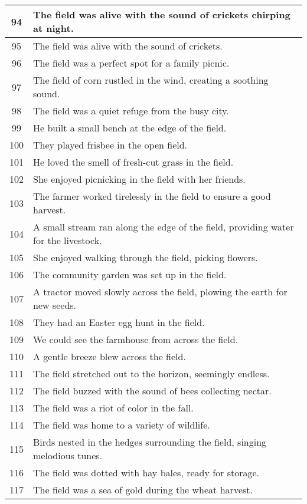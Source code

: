 \begin{longtable}{|c|p{12cm}|}
94 & The field was alive with the sound of crickets chirping at night. \\ \hline
95 & The field was alive with the sound of crickets. \\ \hline
96 & The field was a perfect spot for a family picnic. \\ \hline
97 & The field of corn rustled in the wind, creating a soothing sound. \\ \hline
98 & The field was a quiet refuge from the busy city. \\ \hline
99 & He built a small bench at the edge of the field. \\ \hline
100 & They played frisbee in the open field. \\ \hline
101 & He loved the smell of fresh-cut grass in the field. \\ \hline
102 & She enjoyed picnicking in the field with her friends. \\ \hline
103 & The farmer worked tirelessly in the field to ensure a good harvest. \\ \hline
104 & A small stream ran along the edge of the field, providing water for the livestock. \\ \hline
105 & She enjoyed walking through the field, picking flowers. \\ \hline
106 & The community garden was set up in the field. \\ \hline
107 & A tractor moved slowly across the field, plowing the earth for new seeds. \\ \hline
108 & They had an Easter egg hunt in the field. \\ \hline
109 & We could see the farmhouse from across the field. \\ \hline
110 & A gentle breeze blew across the field. \\ \hline
111 & The field stretched out to the horizon, seemingly endless. \\ \hline
112 & The field buzzed with the sound of bees collecting nectar. \\ \hline
113 & The field was a riot of color in the fall. \\ \hline
114 & The field was home to a variety of wildlife. \\ \hline
115 & Birds nested in the hedges surrounding the field, singing melodious tunes. \\ \hline
116 & The field was dotted with hay bales, ready for storage. \\ \hline
117 & The field was a sea of gold during the wheat harvest. \\ \hline

\end{longtable}

